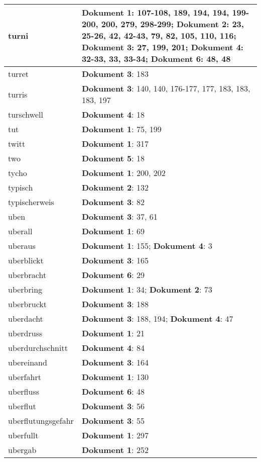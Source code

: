 \documentclass[a5paper]{article}
\begin{document}
\begin{longtable}[l]{|l|p{3in}|}
\hline
turni & \textbf{Dokument 1}: 107-108, 189, 194, 194, 199-200, 200, 279, 298-299; \textbf{Dokument 2}: 23, 25-26, 42, 42-43, 79, 82, 105, 110, 116; \textbf{Dokument 3}: 27, 199, 201; \textbf{Dokument 4}: 32-33, 33, 33-34; \textbf{Dokument 6}: 48, 48 \\
\hline
turret & \textbf{Dokument 3}: 183 \\
\hline
turris & \textbf{Dokument 3}: 140, 140, 176-177, 177, 183, 183, 183, 197 \\
\hline
turschwell & \textbf{Dokument 4}: 18 \\
\hline
tut & \textbf{Dokument 1}: 75, 199 \\
\hline
twitt & \textbf{Dokument 1}: 317 \\
\hline
two & \textbf{Dokument 5}: 18 \\
\hline
tycho & \textbf{Dokument 1}: 200, 202 \\
\hline
typisch & \textbf{Dokument 2}: 132 \\
\hline
typischerweis & \textbf{Dokument 3}: 82 \\
\hline
uben & \textbf{Dokument 3}: 37, 61 \\
\hline
uberall & \textbf{Dokument 1}: 69 \\
\hline
uberaus & \textbf{Dokument 1}: 155; \textbf{Dokument 4}: 3 \\
\hline
uberblickt & \textbf{Dokument 3}: 165 \\
\hline
uberbracht & \textbf{Dokument 6}: 29 \\
\hline
uberbring & \textbf{Dokument 1}: 34; \textbf{Dokument 2}: 73 \\
\hline
uberbruckt & \textbf{Dokument 3}: 188 \\
\hline
uberdacht & \textbf{Dokument 3}: 188, 194; \textbf{Dokument 4}: 47 \\
\hline
uberdruss & \textbf{Dokument 1}: 21 \\
\hline
uberdurchschnitt & \textbf{Dokument 4}: 84 \\
\hline
ubereinand & \textbf{Dokument 3}: 164 \\
\hline
uberfahrt & \textbf{Dokument 1}: 130 \\
\hline
uberfluss & \textbf{Dokument 6}: 48 \\
\hline
uberflut & \textbf{Dokument 3}: 56 \\
\hline
uberflutungsgefahr & \textbf{Dokument 3}: 55 \\
\hline
uberfullt & \textbf{Dokument 1}: 297 \\
\hline
ubergab & \textbf{Dokument 1}: 252 \\

\end{longtable}
\end{document}
